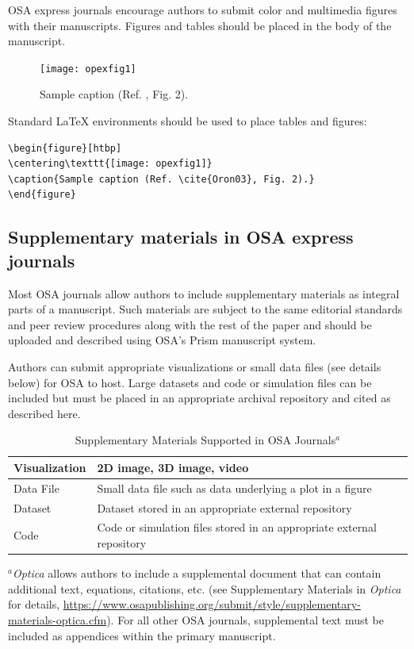 \documentclass[10pt,letterpaper]{article}
\begin{document}
OSA express journals encourage authors to submit color and multimedia figures with their manuscripts. Figures and tables should be placed in the body of the manuscript.

\begin{figure}[h]
\centering\texttt{[image: opexfig1]}
\caption{Sample caption (Ref. \cite{Oron03}, Fig. 2).}
\end{figure}

\noindent Standard \LaTeX{} environments should be used to place tables and figures:
\begin{verbatim}
\begin{figure}[htbp]
\centering\texttt{[image: opexfig1]}
\caption{Sample caption (Ref. \cite{Oron03}, Fig. 2).}
\end{figure}
\end{verbatim}

\subsection{Supplementary materials in OSA express journals}

Most OSA journals allow authors to include supplementary materials as integral parts of a manuscript. Such materials are subject to the same editorial standards and peer review procedures along with the rest of the paper and should be uploaded and described using OSA’s Prism manuscript system.

Authors can submit appropriate visualizations or small data files (see details below) for OSA to host. Large datasets and code or simulation files can be included but must be placed in an appropriate archival repository and cited as described here. 

\begin{table}[h]
\centering
\begin{threeparttable} 
\caption{Supplementary Materials Supported in OSA Journals$^a$}
\begin{tabular}{|l|l|}
\hline
Visualization & 2D image, 3D image, video \\ \hline
Data File     & Small data file such as data underlying a plot in a figure \\ \hline
Dataset       & Dataset stored in an appropriate external repository \\ \hline
Code          & Code or simulation files stored in an appropriate external repository \\
\hline
\end{tabular}
\begin{tablenotes}
\item [] $^a$\textit{Optica} allows authors to include a supplemental document that can contain additional text, equations, citations, etc. (see Supplementary Materials in \textit{Optica} for details, \url{https://www.osapublishing.org/submit/style/supplementary-materials-optica.cfm}). For all other OSA journals, supplemental text must be included as appendices within the primary manuscript.
\end{tablenotes}
\end{threeparttable} 
\end{table}
\end{document}
